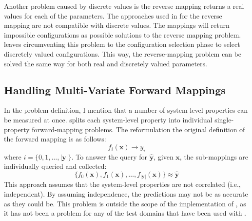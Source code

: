 Another problem caused by discrete values is the reverse mapping returns a real values for each of the parameters.
The approaches used in \fw for the reverse mapping are not compatible with discrete values.
The mappings will return impossible configurations as possible solutions to the reverse mapping problem.
\fw leaves circumventing this problem to the configuration selection phase to select discretely valued configurations.
This way, the reverse-mapping problem can be solved the same way for both real and discretely valued parameters.

\subsection{Handling Multi-Variate Forward Mappings}

In the problem definition, I mention that a number of system-level properties can be measured at once.
\fw splits each system-level property into individual single-property forward-mapping problems.
The reformulation the original definition of the forward mapping is as follows:
\[ f_i(\mathbf x) \rightarrow y_i \]
where $i = \{0, 1, \ldots, |\mathbf y|\}$.
To answer the  query for $\hat{\mathbf y}$, given $\mathbf x$, the sub-mappings are individually queried and collected:
\[ \{f_0(\mathbf x), f_1(\mathbf x), \ldots, f_{|\mathbf y|}(\mathbf x)\} \approx \hat{\mathbf y} \]
This approach assumes that the system-level properties are not correlated (i.e., independent).
By assuming independence, the predictions may not be as accurate as they could be.
This problem is outside the scope of the implementation of \fw, as it has not been a problem for any of the test domains that have been used with \fw.





